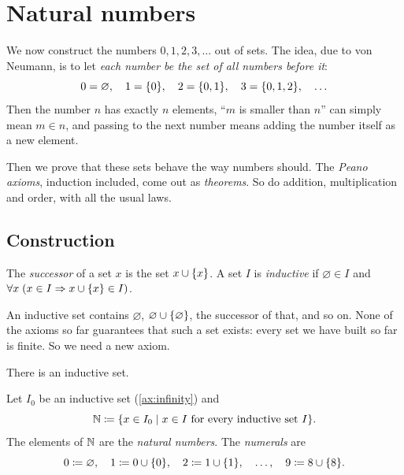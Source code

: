 \chapter{Natural numbers}
\label{ch:naturals}

We now construct the numbers $0, 1, 2, 3, \dots$ out of sets. The idea, due to
von Neumann, is to let \emph{each number be the set of all numbers before it}:
\[
  0 = \varnothing, \quad 1 = \lbrace 0 \rbrace, \quad 2 = \lbrace 0, 1 \rbrace, \quad 3 = \lbrace 0, 1,
  2 \rbrace, \quad \dots
\]
Then the number $n$ has exactly $n$ elements, \enquote{$m$ is smaller than $n$}
can simply mean $m \in n$, and passing to the next number means adding the number
itself as a new element.

Then we prove that these sets behave the way numbers should. The \emph{Peano
axioms}, induction included, come out as \emph{theorems}. So do addition,
multiplication and order, with all the usual laws.

\section{Construction}

\begin{definition}
\label{def:inductive}
The \emph{successor} of a set $x$ is the set $x \cup \lbrace x \rbrace$. A set $I$ is
\emph{inductive} if $\varnothing \in I$ and $\forall x\; (x \in I \Rightarrow x
\cup \lbrace x \rbrace \in I)$.
\end{definition}

An inductive set contains $\varnothing$, $\varnothing \cup \lbrace \varnothing \rbrace$, the
successor of that, and so on. None of the axioms so far guarantees that such a set
exists: every set we have built so far is finite. So we need a new axiom.

\begin{axiom}[Infinity]
\label{ax:infinity}
There is an inductive set.
\end{axiom}

\begin{definition}
\label{def:naturals}
Let $I_0$ be an inductive set (\cref{ax:infinity}) and
\[
  \mathbb{N} \coloneqq \lbrace x \in I_0 \mid x \in I \text{ for every inductive set } I \rbrace.
\]
The elements of $\mathbb{N}$ are the \emph{natural numbers}. The \emph{numerals} are
\[
  0 \coloneqq \varnothing,\quad 1 \coloneqq 0 \cup \lbrace 0 \rbrace,\quad 2 \coloneqq 1 \cup
  \lbrace 1 \rbrace,\quad \dots,\quad 9 \coloneqq 8 \cup \lbrace 8 \rbrace.
\]
\end{definition}

